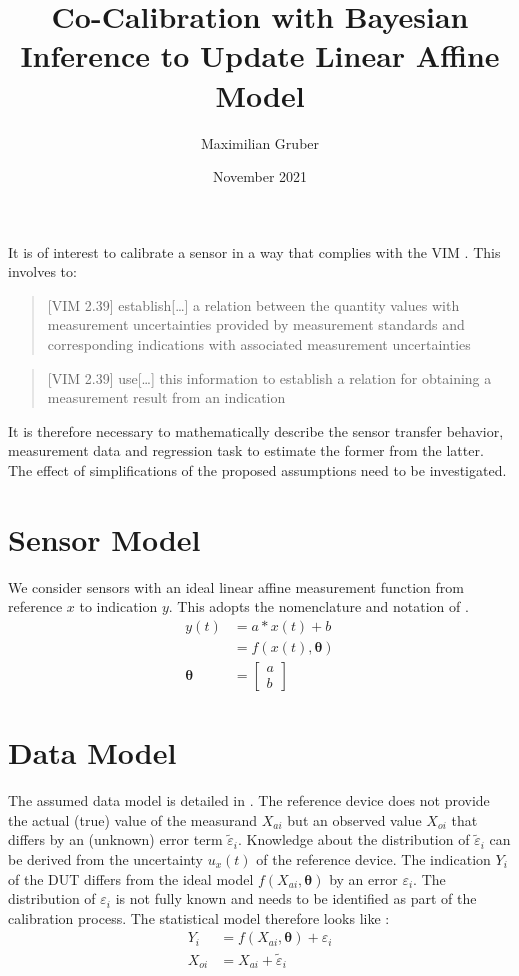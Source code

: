 \documentclass[10pt]{article}
\title{Co-Calibration with Bayesian Inference to Update Linear Affine Model}
\author{Maximilian Gruber}    %
\date{November 2021}
\renewcommand{\vec}[1]{\boldsymbol{#1}}
\begin{document}
\maketitle

It is of interest to calibrate a sensor in a way that complies with the VIM \cite{bipm_2012}. 
This involves to:

\begin{quote}[VIM 2.39]
    establish[\dots] a relation between the quantity values with measurement uncertainties provided by measurement standards and corresponding indications with associated measurement uncertainties
\end{quote}

\begin{quote}[VIM 2.39]
    use[\dots] this information to establish a relation for obtaining a measurement result from an indication
\end{quote}

It is therefore necessary to mathematically describe the sensor transfer behavior, measurement data and regression task to estimate the former from the latter.
The effect of simplifications of the proposed assumptions need to be investigated.


\section{Sensor Model}
We consider sensors with an ideal linear affine measurement function from reference $x$ to indication $y$.
This adopts the nomenclature and notation of \cite{bipm_2008,bipm_2012}.
\begin{align}
    y(t) &= a*x(t) + b \nonumber \\
       &= f(x(t), \vec{\theta}) \\
    \vec{\theta} &= \begin{bmatrix} a \\ b \end{bmatrix}
\end{align}


\section{Data Model}
The assumed data model is detailed in \cite{dellaportas_1995}.
The reference device does not provide the actual (true) value of the measurand $X_{ai}$ but an observed value $X_{oi}$ that differs by an (unknown) error term $\tilde{\varepsilon}_i$.
Knowledge about the distribution of $\tilde{\varepsilon}_i$ can be derived from the uncertainty $u_x(t)$ of the reference device.
The indication $Y_i$ of the DUT differs from the ideal model $f(X_{ai}, \vec{\theta})$ by an error $\varepsilon_i$.
The distribution of $\varepsilon_i$ is not fully known and needs to be identified as part of the calibration process.
The statistical model therefore looks like \cite{dellaportas_1995}:
\begin{align}
    Y_i &= f(X_{ai}, \vec{\theta}) + \varepsilon_i \\
    X_{oi} &= X_{ai} + \tilde{\varepsilon}_i
\end{align}
\end{document}
